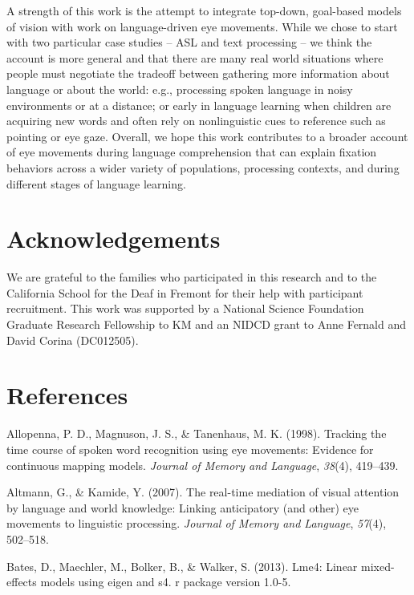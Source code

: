 \documentclass[10pt, letterpaper]{article}
\begin{document}
A strength of this work is the attempt to integrate top-down, goal-based
models of vision with work on language-driven eye movements. While we
chose to start with two particular case studies -- ASL and text
processing -- we think the account is more general and that there are
many real world situations where people must negotiate the tradeoff
between gathering more information about language or about the world:
e.g., processing spoken language in noisy environments or at a distance;
or early in language learning when children are acquiring new words and
often rely on nonlinguistic cues to reference such as pointing or eye
gaze. Overall, we hope this work contributes to a broader account of eye
movements during language comprehension that can explain fixation
behaviors across a wider variety of populations, processing contexts,
and during different stages of language learning.

\section{Acknowledgements}\label{acknowledgements}

We are grateful to the families who participated in this research and to
the California School for the Deaf in Fremont for their help with
participant recruitment. This work was supported by a National Science
Foundation Graduate Research Fellowship to KM and an NIDCD grant to Anne
Fernald and David Corina (DC012505).

\section{References}\label{references}

\setlength{\parindent}{-0.1in} \setlength{\leftskip}{0.125in} \noindent

\hypertarget{refs}{}
\hypertarget{ref-allopenna1998tracking}{}
Allopenna, P. D., Magnuson, J. S., \& Tanenhaus, M. K. (1998). Tracking
the time course of spoken word recognition using eye movements: Evidence
for continuous mapping models. \emph{Journal of Memory and Language},
\emph{38}(4), 419--439.

\hypertarget{ref-altmann2007real}{}
Altmann, G., \& Kamide, Y. (2007). The real-time mediation of visual
attention by language and world knowledge: Linking anticipatory (and
other) eye movements to linguistic processing. \emph{Journal of Memory
and Language}, \emph{57}(4), 502--518.

\hypertarget{ref-bates2013lme4}{}
Bates, D., Maechler, M., Bolker, B., \& Walker, S. (2013). Lme4: Linear
mixed-effects models using eigen and s4. r package version 1.0-5.
\end{document}
